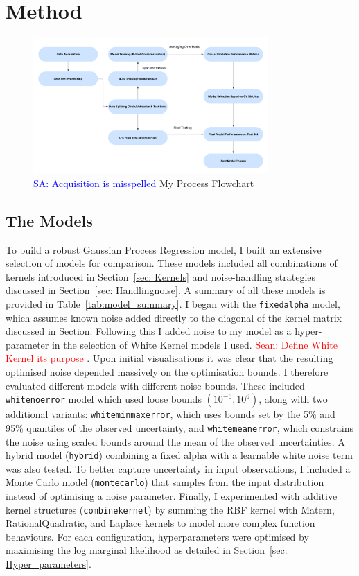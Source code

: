 \documentclass[12pt]{article}
\newcommand{\Sarp}[1]{{\textcolor{blue}{{SA: #1}} }}
\newcommand{\Sean}[1]{{\textcolor{red}{{Sean: #1}} }}
\begin{document}
\section{Method}
\begin{figure}[H]
    \centering
   \includegraphics[width=0.8\textwidth]{LatexPlots/Flowchart.png}
    \caption{\Sarp{Acquisition is misspelled} My Process Flowchart}
    \label{fig:flowchart}
\end{figure}
\subsection{The Models}
To build a robust Gaussian Process Regression model, I built an extensive selection of models for comparison.
These models included all combinations of kernels introduced in Section~\ref{sec: Kernels} and noise-handling strategies discussed in Section~\ref{sec: Handlingnoise}. 
A summary of all these models is provided in Table~\ref{tab:model_summary}. I began with the \texttt{fixedalpha} model, which assumes known noise added directly to the diagonal of the kernel matrix discussed in Section.
Following this I added noise to my model as a hyper-parameter in the selection of White Kernel models I used. \Sean{Define White Kernel its purpose}. Upon initial visualisations it was clear that the resulting optimised noise depended massively on the optimisation bounds. I therefore evaluated different models with different noise bounds. These included
\texttt{whitenoerror} model which used loose bounds \((10^{-6}, 10^6)\), along with two additional variants: \texttt{whiteminmaxerror}, which uses bounds set by the 5\% and 95\% quantiles of the observed uncertainty, and \texttt{whitemeanerror}, which constrains the noise using scaled bounds around the mean of the observed uncertainties. 
A hybrid model (\texttt{hybrid}) combining a fixed alpha with a learnable white noise term was also tested. To better capture uncertainty in input observations, I included a Monte Carlo model (\texttt{montecarlo}) that samples from the input distribution instead of optimising a noise parameter.
Finally, I experimented with additive kernel structures (\texttt{combinekernel}) by summing the RBF kernel with Matern, RationalQuadratic, and Laplace kernels to model more complex function behaviours. For each configuration, hyperparameters were optimised by maximising the log marginal likelihood as detailed in Section~\ref{sec: Hyper_parameters}.
\end{document}
